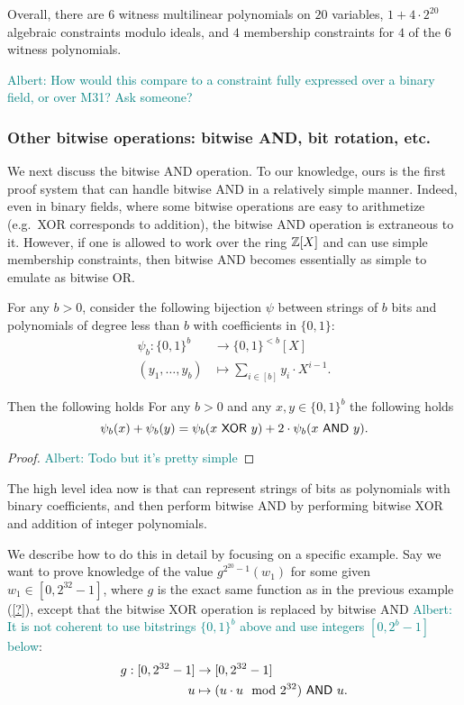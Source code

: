 \documentclass[11pt,letterpaper,usenames,dvipsnames]{article}
\newcommand{\albert}[1]{\textcolor{teal}{Albert: {#1}}}
\begin{document}
  Overall, there are $6$ witness multilinear polynomials on $20$ variables, $1 +4\cdot 2^{20}$ algebraic constraints modulo ideals, and $4$ membership constraints for $4$ of the $6$ witness polynomials. 

  \albert{How would this compare to a constraint fully expressed over a binary field, or over M31? Ask someone? }
  
\subsubsection{Other bitwise operations: bitwise AND, bit rotation, etc.}


We next discuss the bitwise AND operation. To our knowledge, ours is the first proof system that can handle bitwise AND in a relatively simple manner. Indeed, even in binary fields, where some bitwise operations are easy to arithmetize (e.g.\ XOR corresponds to addition), the bitwise AND operation is extraneous to it. However, if one is allowed to work over the ring $\mathbb{Z}[X]$ and can use simple membership constraints, then bitwise AND becomes essentially as simple to emulate as bitwise OR. 

For any $b> 0$, consider the following bijection $\psi$ between strings of $b$ bits and polynomials of degree less than $b$ with coefficients in $\{0,1\}$:
%
\begin{align*}
\psi_b: \{0,1\}^{b} &\to \{0,1\}^{<b}[X]\\
(y_1,\ldots, y_{b}) &\mapsto \sum_{i\in [b]} y_i\cdot X^{i-1}.
\end{align*}


\begin{lemma}Then the following holds
%
For any $b>0$ and any $x,y\in \{0,1\}^{b}$ the following holds
$$
\psi_b(x) + \psi_b(y) = \psi_b(x \ \mathsf{XOR}\  y) + 2\cdot \psi_b(x \ \mathsf{AND}\  y).
$$
\end{lemma}
\begin{proof}
\albert{Todo but it's pretty simple}
\end{proof}
%
The high level idea now is that can represent strings of bits as polynomials with binary coefficients, and then perform bitwise AND by performing bitwise XOR and addition of integer polynomials. 

We describe how to do this in detail by focusing on a specific example.  Say we want to prove knowledge of the value $g^{2^{20}-1}(w_1)$ for some given $w_1\in [0, 2^{32}-1]$, where $g$ is the exact same function as in the previous example (\cref{?}), except that the bitwise XOR operation is replaced by bitwise AND \albert{It is not coherent to use bitstrings $\{0,1\}^b$ above and use integers $[0, 2^{b}-1]$ below}:
%
\begin{align*}
g: [0, 2^{32}-1] &\to [0, 2^{32}-1]\\
u &\mapsto (u\cdot u \mod 2^{32}) \ \mathsf{AND}\  u.
\end{align*}
\end{document}
